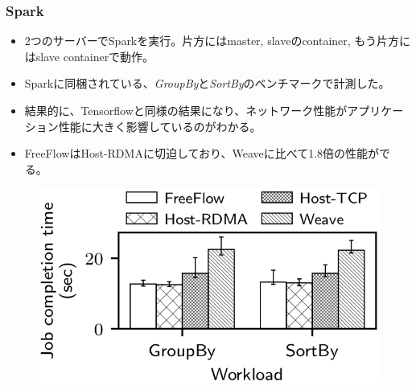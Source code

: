 \documentclass[dvipdfmx,9pt,notheorems]{beamer}
\theoremstyle{definition}
\begin{document}
\begin{frame}\frametitle{Spark}
	\begin{itemize}
		\item 2つのサーバーでSparkを実行。片方にはmaster, slaveのcontainer, もう片方にはslave containerで動作。
		\item Sparkに同梱されている、\textit{GroupBy}と\textit{SortBy}のベンチマークで計測した。
		\item 結果的に、Tensorflowと同様の結果になり、ネットワーク性能がアプリケーション性能に大きく影響しているのがわかる。
		\item FreeFlowはHost-RDMAに切迫しており、Weaveに比べて1.8倍の性能がでる。
	\end{itemize}
  \begin{figure}[htb]
    \centering
		\includegraphics[scale=1]{fig/figure16.png}
  \end{figure}
\end{frame}
\end{document}
